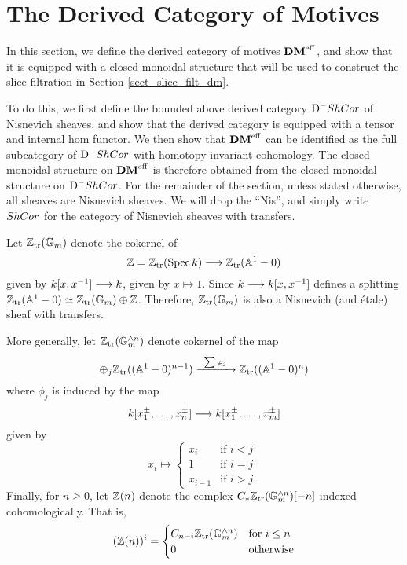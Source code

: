 \newpage
\section{The Derived Category of Motives}\label{sect_dmeff_and_dm}

In this section, we define the derived category of motives $\DMeff$,
and show that it is equipped with a closed monoidal structure that
will be used to construct the slice filtration in Section 
\ref{sect_slice_filt_dm}.

To do this, we first define the bounded above derived category 
$\DShCor$ of Nisnevich sheaves, and show that the derived 
category is equipped with a tensor and internal hom functor. We 
then show that $\DMeff$ can be identified as the full subcategory 
of $\DShCor$ with homotopy invariant cohomology. The closed
monoidal structure on $\DMeff$ is therefore obtained from the
closed monoidal structure on $\DShCor$. For the remainder of the
section, unless stated otherwise, all sheaves are Nisnevich 
sheaves. We will drop the ``Nis'', and simply write $\ShCor$ for 
the category of Nisnevich sheaves with transfers.

\begin{defn}\label{def_z_n}
Let $\Ztr(\Gm)$ denote the cokernel of
\[
\Z = \Ztr(\Spec \basefield) \to \Ztr(\A^1 - 0)
\]
given by $\basefield [x, x^{-1}] \to \basefield$, given by
$x \mapsto 1$. Since $\basefield \to \basefield[x, x^{-1}]$
defines a splitting $\Ztr(\A^1 - 0) \simeq \Ztr(\Gm) \oplus \Z$.
Therefore, $\Ztr(\Gm)$ is also a Nisnevich (and \'etale) sheaf 
with transfers.

More generally, let $\Ztr(\Gmn{n})$ denote cokernel of the map 
\[
\oplus_j \Ztr((\A^1 - 0)^{n - 1}) \xrightarrow{\;\;\sum \phi_j\;\;}
\Ztr((\A^1 - 0)^n)
\]
where $\phi_j$ is induced by the map
\[
\basefield[x_1^{\pm},\dots,x_n^{\pm}] \to \basefield[x_1^{\pm},
\dots, x_m^{\pm}]
\]
given by
\[
x_i \mapsto
\begin{cases}
x_i &\textrm{if } i < j \\
1   &\textrm{if } i = j \\
x_{i - 1} &\textrm{if } i > j.
\end{cases}
\]
Finally, for $n \geq 0$, let $\Z(n)$ denote the complex $\suslC 
\Ztr(\Gmn{n})[-n]$ indexed cohomologically. That is, 
\[
(\Z(n))^i = \begin{cases}
\suslC[n - i]\Ztr(\Gmn{n}) & \textrm{for }i \leq n \\
0 & \textrm{otherwise}
\end{cases}
\]
\end{defn}

